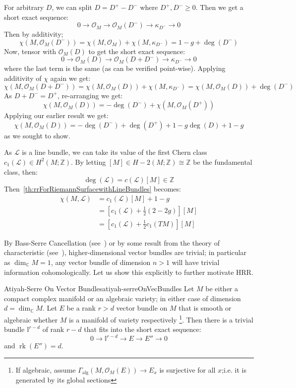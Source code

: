 \documentclass{book}
\newenvironment{Proof}[1][]
  {\begin{ProofTcb}[#1]}
  {\end{ProofTcb}}
\newcommand{\Z}{{\mathbb{Z}}}
\newcommand{\BI}{{\mathbb{I}}}
\newcommand{\C}{{\mathbb{C}}}
\newcommand{\CL}{{\mathcal{L}}}
\newcommand{\CO}{{\mathcal{O}}}
\newcommand{\rk}{{\operatorname{rk}}}
\renewcommand{\deg}{{\operatorname{deg}}}
\begin{document}
\begin{Proof}
  For arbitrary $D$, we can split $D = D^+ - D^-$ where $D^+, D^- \ge 0$. Then we get a short exact sequence:
  \[
    0 \to \CO_M \to \CO_M(D^-) \to \kappa_{D^-} \to 0
  \]
  Then by additivity;
  \[
    \chi(M, \CO_M(D^-)) = \chi(M, \CO_M) +\chi(M, \kappa_{D^-}) = 1-g + \deg(D^-)
  \]
  Now, tensor with $\CO_M(D)$ to get the short exact sequence:
  \[
    0 \to \CO_M(D) \to \CO_M(D+D^-) \to \kappa_{D^-} \to 0
  \]
  where the last term is the same (as can be verified point-wise). Applying additivity of $\chi$ again we get:
  \[
    \chi(M, \CO_M(D+D^-)) = \chi(M, \CO_M(D)) + \chi(M, \kappa_{D^-}) = \chi(M, \CO_M(D)) + \deg(D^-)
  \]
  As $D + D^- = D^+$, re-arranging we get:
  \[
     \chi(M, \CO_M(D)) =  - \deg(D^-) + \chi(M, \CO_M(D^+))
  \]
  Applying our earlier result we get:
  \[
     \chi(M, \CO_M(D)) =  - \deg(D^-) + \deg(D^+) + 1-g  \deg(D) + 1-g
  \]
  as we sought to show.
\end{Proof}

As $\CL$ is a line bundle, we can take its value of the first Chern class $c_1(\CL) \in H^2(M; \Z)$. By
letting $[M] \in H-2(M; \Z) \cong \Z$ be the fundamental class, then:
\[
  \deg(\CL) = c(\CL)[M] \in \Z
\]
Then~\cref{th:rrForRiemannSurfacewithLineBundles} becomes:
\begin{align*}
  \chi(M, \CL) &= c_1(\CL)[M] + 1-g\\
               &= \left[c_1(\CL) + \frac{1}{2}(2-2g)\right][M]\\
               &= \left[c_1(\CL) + \frac{1}{2}c_1(TM)\right][M]
\end{align*}

By Bass-Serre Cancellation (see~\cite[section~5.1]{NateKTheory}) or by some result from the theory of
characteristic (see~\cite[section~3.2]{NateKTheory}), higher-dimensional vector bundles are trivial; in
particular as $\dim_\C M = 1$, any vector bundle of dimension $n > 1$ will have trivial information
cohomologically. Let us show this explicitly to further motivate HRR.


\begin{thm}{Atiyah-Serre On Vector Bundles}{atiyah-serreOnVecBundles}
  Let $M$ be either a compact complex manifold or an algebraic variety; in either case of dimension $d
  =\dim_\C M$. Let $E$ be a rank $r> d$ vector bundle on $M$ that is smooth or algebraic whether $M$ is a
  manifold of variety respectively \footnote{If algebraic, assume
    $\Gamma_{\operatorname{alg}}(M, \CO_M(E)) \to E_x$ is
  surjective for all $x$;i.e. it is generated by its global sections}. Then there is a trivial bundle
  $\BI^{r-d}$ of rank $r-d$ that fits into the short exact sequence:
  \[
    0 \to \BI^{r-d} \to E \to E'' \to 0
  \]
  and $\rk(E'') = d$.
\end{thm}
\end{document}
